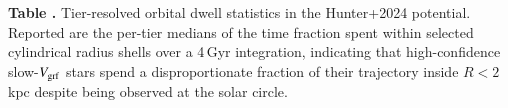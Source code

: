 \begin{center}
\label{tab:dwell}
\begin{minipage}{\columnwidth}
\small\textbf{Table \thetable.} Tier-resolved orbital dwell statistics
in the Hunter+2024 potential. Reported are the per-tier medians of
the time fraction spent within selected cylindrical radius shells
over a 4\,Gyr integration, indicating that high-confidence
slow-$V_{\mathrm{grf}}$ stars spend a disproportionate fraction of their
trajectory inside $R<2\,$kpc despite being observed at the solar
circle.
\end{minipage}
\vspace{0.4ex}

\scriptsize
\setlength{\tabcolsep}{4pt}
\end{center}
\par{}
